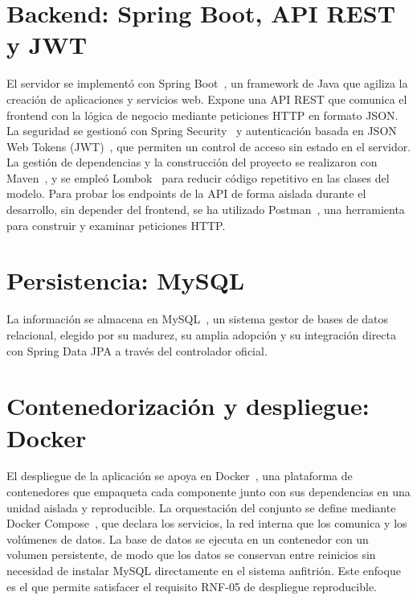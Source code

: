 \documentclass[12pt,a4paper,twoside,openright]{book}
\begin{document}
    \section{Backend: Spring Boot, API REST y JWT}
    
    El servidor se implementó con Spring Boot~\cite{springboot}, un framework de Java que agiliza
    la creación de aplicaciones y servicios web. Expone una API REST que
    comunica el frontend con la lógica de negocio mediante peticiones HTTP en
    formato JSON. La seguridad se gestionó con Spring Security~\cite{springsecurity} y autenticación
    basada en JSON Web Tokens (JWT)~\cite{jwt}, que permiten un control de acceso sin
    estado en el servidor. La gestión de dependencias y la construcción del
    proyecto se realizaron con Maven~\cite{maven}, y se empleó Lombok~\cite{lombok} para reducir código
    repetitivo en las clases del modelo. Para probar los endpoints de la API
    de forma aislada durante el desarrollo, sin depender del frontend,
    se ha utilizado Postman~\cite{postman}, una herramienta para construir y examinar peticiones HTTP.
    
    \section{Persistencia: MySQL}
    
    La información se almacena en MySQL~\cite{mysql}, un sistema gestor de bases de
    datos relacional, elegido por su madurez, su amplia adopción y su integración
    directa con Spring Data JPA a través del controlador oficial.
    
    \section{Contenedorización y despliegue: Docker}
    
    El despliegue de la aplicación se apoya en Docker~\cite{docker}, una
    plataforma de contenedores que empaqueta cada componente junto con sus
    dependencias en una unidad aislada y reproducible. La orquestación del
    conjunto se define mediante Docker Compose~\cite{dockercompose}, que declara
    los servicios, la red interna que los comunica y los volúmenes de datos. La
    base de datos se ejecuta en un contenedor con un volumen persistente, de modo
    que los datos se conservan entre reinicios sin necesidad de instalar MySQL
    directamente en el sistema anfitrión. Este enfoque es el que permite
    satisfacer el requisito RNF-05 de despliegue reproducible.
    
\end{document}
